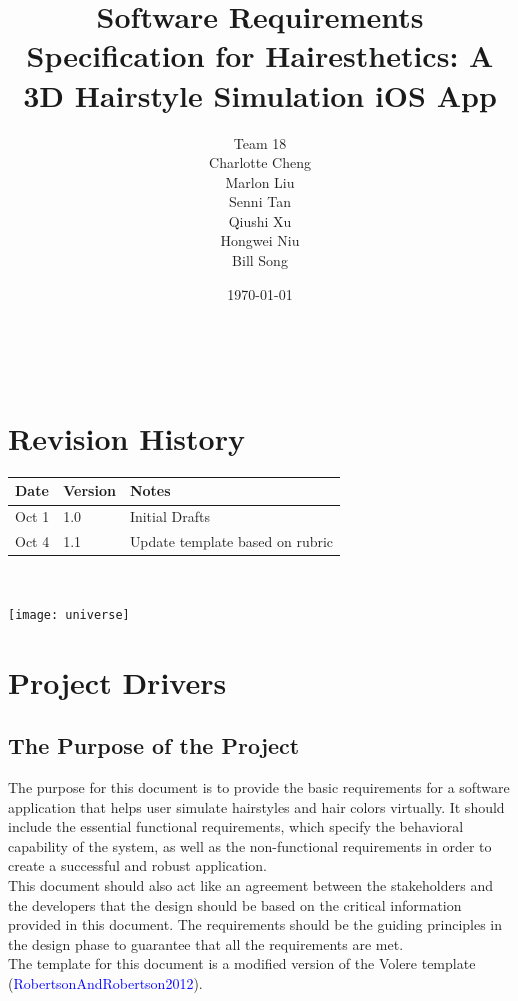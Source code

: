 \documentclass[12pt]{article}
\begin{document}
\title{Software Requirements Specification for Hairesthetics: A 3D Hairstyle Simulation iOS App} 

\author{Team 18 \\ Charlotte Cheng
        \\ Marlon Liu
        \\ Senni Tan
        \\ Qiushi Xu
        \\ Hongwei Niu
        \\ Bill Song
}

\date{\today}
	
\maketitle

~\newpage


\tableofcontents
\listoftables
\listoffigures

\section*{Revision History}

\begin{tabularx}{\textwidth}{p{3cm}p{2cm}X}
\toprule {\bf Date} & {\bf Version} & {\bf Notes}\\
\midrule
Oct 1 & 1.0 & Initial Drafts\\
Oct 4 & 1.1 & Update template based on rubric\\
\bottomrule
\end{tabularx}

~\newpage

  

\texttt{[image: universe]}

\section{Project Drivers}

\subsection{The Purpose of the Project}
  
The purpose for this document is to provide the basic requirements for a software application that helps user simulate hairstyles and hair colors virtually. It should include the essential functional requirements, which specify the behavioral capability of the system, as well as the non-functional requirements in order to create a successful and robust application. \\
\newline
\noindent
This document should also act like an agreement between the stakeholders and the developers that the design should be based on the critical information provided in this document. The requirements should be the guiding principles in the design phase to guarantee that all the requirements are met. \\
\newline
The template for this document is a modified version 
of the Volere template (\textcolor{blue}{RobertsonAndRobertson2012}).
\end{document}
